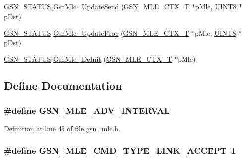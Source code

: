 \begin{DoxyCompactItemize}
\item 
\hyperlink{a00660_gada5951904ac6110b1fa95e51a9ddc217}{GSN\_\-STATUS} \hyperlink{a00527_a0077faacbf86e11bab8fc11d57c165dd}{GsnMle\_\-UpdateSend} (\hyperlink{a00151}{GSN\_\-MLE\_\-CTX\_\-T} $\ast$pMle, \hyperlink{a00660_gab27e9918b538ce9d8ca692479b375b6a}{UINT8} $\ast$pDst)
\item 
\hyperlink{a00660_gada5951904ac6110b1fa95e51a9ddc217}{GSN\_\-STATUS} \hyperlink{a00527_a78283388ada8354f15e85c70595a29d5}{GsnMle\_\-UpdateProc} (\hyperlink{a00151}{GSN\_\-MLE\_\-CTX\_\-T} $\ast$pMle, \hyperlink{a00660_gab27e9918b538ce9d8ca692479b375b6a}{UINT8} $\ast$pDst)
\item 
\hyperlink{a00660_gada5951904ac6110b1fa95e51a9ddc217}{GSN\_\-STATUS} \hyperlink{a00527_a5d163a75ad34d795bb4c61796c8d0a65}{GsnMle\_\-DeInit} (\hyperlink{a00151}{GSN\_\-MLE\_\-CTX\_\-T} $\ast$pMle)
\end{DoxyCompactItemize}


\subsection{Define Documentation}
\hypertarget{a00527_a5244d0b132f1b7ff1249cc8d4230047a}{
\subsubsection[{GSN\_\-MLE\_\-ADV\_\-INTERVAL}]{\setlength{\rightskip}{0pt plus 5cm}\#define GSN\_\-MLE\_\-ADV\_\-INTERVAL}}
\label{a00527_a5244d0b132f1b7ff1249cc8d4230047a}


Definition at line 45 of file gsn\_\-mle.h.

\hypertarget{a00527_abb17d914caf5e73c27e832ccde5117f9}{
\subsubsection[{GSN\_\-MLE\_\-CMD\_\-TYPE\_\-LINK\_\-ACCEPT}]{\setlength{\rightskip}{0pt plus 5cm}\#define GSN\_\-MLE\_\-CMD\_\-TYPE\_\-LINK\_\-ACCEPT~1}}
\label{a00527_abb17d914caf5e73c27e832ccde5117f9}


